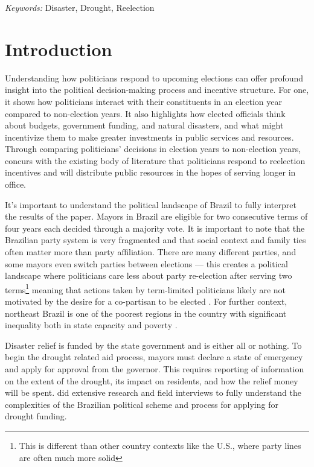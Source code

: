 \documentclass[12pt]{article}
\begin{document}
\noindent%
{\it Keywords:} Disaster, Drought, Reelection
\vfill

\newpage
{} %

\hypertarget{introduction}{%
\section{Introduction}\label{introduction}}

Understanding how politicians respond to upcoming elections can offer
profound insight into the political decision-making process and
incentive structure. For one, it shows how politicians interact with
their constituents in an election year compared to non-election years.
It also highlights how elected officials think about budgets, government
funding, and natural disasters, and what might incentivize them to make
greater investments in public services and resources. Through comparing
politicians' decisions in election years to non-election years,
\citet{cooperman2021natural} concurs with the existing body of
literature
\citep{alesina1989politics, finan2005reelection, martinez2009theory}
that politicians respond to reelection incentives and will distribute
public resources in the hopes of serving longer in office.

It's important to understand the political landscape of Brazil to fully
interpret the results of the paper. Mayors in Brazil are eligible for
two consecutive terms of four years each decided through a majority
vote. It is important to note that the Brazilian party system is very
fragmented and that social context and family ties often matter more
than party affiliation. There are many different parties, and some
mayors even switch parties between elections \citep{novaes2018disloyal}
--- this creates a political landscape where politicians care less about
party re-election after serving two terms\footnote{This is different
  than other country contexts like the U.S., where party lines are often
  much more solid} meaning that actions taken by term-limited
politicians likely are not motivated by the desire for a co-partisan to
be elected \citep{franzese2002electoral, clark1998international}. For
further context, northeast Brazil is one of the poorest regions in the
country with significant inequality both in state capacity and poverty
\citep{tendler1997good, finan2009decentralized, ottonelli2014pobreza}.

Disaster relief is funded by the state government and is either all or
nothing. To begin the drought related aid process, mayors must declare a
state of emergency and apply for approval from the governor. This
requires reporting of information on the extent of the drought, its
impact on residents, and how the relief money will be spent.
\citet{cooperman2021natural} did extensive research and field interviews
to fully understand the complexities of the Brazilian political scheme
and process for applying for drought funding.
\end{document}
